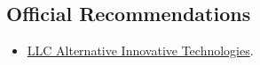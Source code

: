 \documentclass{vl}
\begin{document}
    \subsection*{Official Recommendations}
    \begin{itemize}
        \itemsep0em
        \item \href{https://github.com/volodya-lombrozo/volodya-lombrozo.github.io/blob/24eb2bbed8fac71c90ddef6ff4d93de8fb4f9f26/_cv/recommendations/letter_of_recommendation_ait.pdf}{LLC Alternative Innovative Technologies}.
    \end{itemize}
\end{document}
